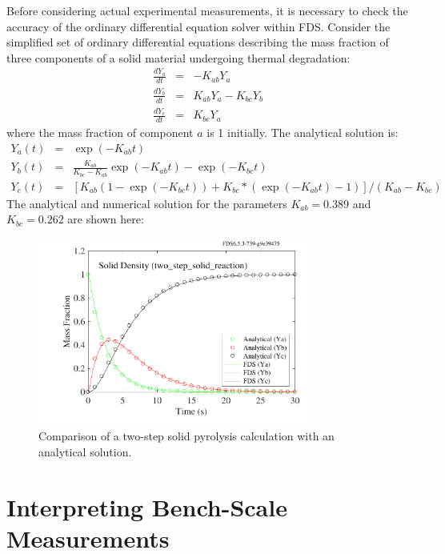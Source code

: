 \documentclass[11pt]{book}
\begin{document}
Before considering actual experimental measurements, it is necessary to check the accuracy of the ordinary differential
equation solver within FDS.
Consider  the simplified set  of ordinary  differential equations  describing the mass
fraction of  three  components of  a  solid material  undergoing thermal
degradation:
\begin{eqnarray}
    \frac{dY_a}{dt} &=&  -K_{ab} Y_a \nonumber  \\
    \frac{dY_b}{dt} &=&   K_{ab} Y_a  -  K_{bc}  Y_b  \\
    \frac{dY_c}{dt} &=&   K_{bc} Y_a
    \nonumber
\end{eqnarray}
where  the  mass  fraction  of  component  $a$  is  1  initially.  The
analytical solution is:
\begin{eqnarray}
    Y_a(t)    &=&    \exp(-K_{ab}t)    \nonumber   \\
    Y_b(t)    &=&    \frac{K_{ab}}{K_{bc}-K_{ab}} \exp(-K_{ab} t)  - \exp(-K_{bc} t) \\
    Y_c(t)    &=&    \left[   K_{ab}    (1-\exp(-K_{bc} t) )    +  K_{bc}*(\exp(-K_{ab} t) -1) \right] / (K_{ab}-K_{bc})
\end{eqnarray}
The analytical and  numerical solution for the parameters $K_{ab} = 0.389$ and $K_{bc} = 0.262$ are shown here:

\begin{figure}[ht]
\begin{center}
\includegraphics[width=3.5in]{SCRIPT_FIGURES/two_step_solid_reaction}
\end{center}
\caption[The {\bf two\_step\_solid\_reaction} test case.]{Comparison of a two-step solid pyrolysis calculation with an analytical solution.}
\label{two_step_solid_reaction}
\end{figure}




\clearpage

\section{Interpreting Bench-Scale Measurements}
\label{solid_kinetics}
\end{document}
